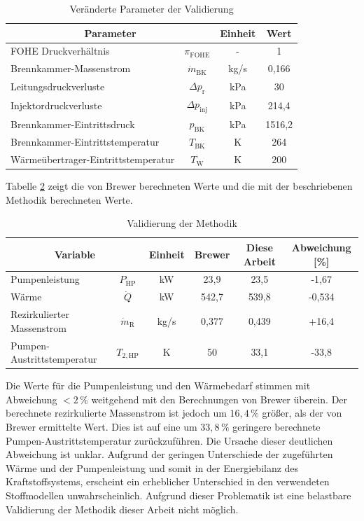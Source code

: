 \begin{table}[ht]
    \centering
	\caption{Veränderte Parameter der Validierung}
	\begin{tabular} {|l|c|c|c|} \hline%
    \multicolumn{2}{|c|}{Parameter} & Einheit & Wert\\ \hline\hline%
    FOHE Druckverhältnis & $\pi_\mathrm{FOHE}$ & - & 1 \\ \hline
    Brennkammer-Massenstrom & $\dot{m}_\mathrm{BK}$ & kg/s & 0,166 \\ \hline
    Leitungsdruckverluste & $\Delta p_\mathrm{r}$ & kPa & 30 \\ \hline
    Injektordruckverluste & $\Delta p_\mathrm{inj}$ & kPa & 214,4 \\ \hline
    Brennkammer-Eintrittsdruck & $p_\mathrm{BK}$ & kPa & 1516,2 \\ \hline
    Brennkammer-Eintrittstemperatur & $T_\mathrm{BK}$ & K & 264 \\ \hline
    Wärmeübertrager-Eintrittstemperatur & $T_\mathrm{W}$ & K & 200 \\ \hline
    \end{tabular}	
    \label{Tab:brewer}%
\end{table}
\FloatBarrier 

Tabelle \ref{Tab:validation} zeigt die von Brewer berechneten Werte und die mit der beschriebenen Methodik berechneten Werte. 

\begin{table}[ht]
    \centering
	\caption{Validierung der Methodik}
	\begin{tabular} {|l|c|c|c|c|c|} \hline%
    \multicolumn{2}{|c|}{Variable} & Einheit & Brewer \cite{Brewer.1991} & Diese Arbeit & Abweichung [\%] \\ \hline\hline%
    Pumpenleistung & $P_\mathrm{HP}$ & kW & 23,9 & 23,5 & -1,67 \\ \hline
    Wärme & $\dot{Q}$ & kW & 542,7 & 539,8 & -0,534 \\ \hline
    Rezirkulierter Massenstrom & $\dot{m}_\mathrm{R}$ & kg/s & 0,377 & 0,439 & +16,4 \\ \hline
    Pumpen-Austrittstemperatur & $T_{2,\mathrm{HP}}$ & K & 50 & 33,1 & -33,8 \\ \hline
    \end{tabular}	
    \label{Tab:validation}%
\end{table}
\FloatBarrier 

Die Werte für die Pumpenleistung und den Wärmebedarf stimmen mit Abweichung $<2\,\%$ weitgehend mit den Berechnungen von Brewer überein. Der berechnete rezirkulierte Massenstrom ist jedoch um $16,4\,\%$ größer, als der von  Brewer ermittelte Wert. Dies ist auf eine um $33,8\,\%$ geringere berechnete Pumpen-Austrittstemperatur zurückzuführen. Die Ursache dieser deutlichen Abweichung ist unklar. Aufgrund der geringen Unterschiede der zugeführten Wärme und der Pumpenleistung und somit in der Energiebilanz des Kraftstoffsystems, erscheint ein erheblicher Unterschied in den verwendeten Stoffmodellen unwahrscheinlich. Aufgrund dieser Problematik ist eine belastbare Validierung der Methodik dieser Arbeit nicht möglich.

